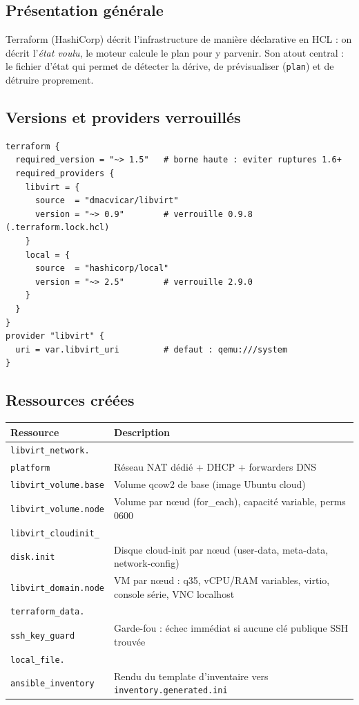 \documentclass[12pt,a4paper]{article}
\begin{document}
\subsection{Présentation générale}
Terraform (HashiCorp) décrit l'infrastructure de manière déclarative en HCL : on décrit l'\emph{état voulu}, le moteur calcule le plan pour y parvenir. Son atout central : le fichier d'état qui permet de détecter la dérive, de prévisualiser (\texttt{plan}) et de détruire proprement.

\subsection{Versions et providers verrouillés}
\begin{lstlisting}[caption={main.tf --- épinglage des versions (extrait)}]
terraform {
  required_version = "~> 1.5"   # borne haute : eviter ruptures 1.6+
  required_providers {
    libvirt = {
      source  = "dmacvicar/libvirt"
      version = "~> 0.9"        # verrouille 0.9.8 (.terraform.lock.hcl)
    }
    local = {
      source  = "hashicorp/local"
      version = "~> 2.5"        # verrouille 2.9.0
    }
  }
}
provider "libvirt" {
  uri = var.libvirt_uri         # defaut : qemu:///system
}
\end{lstlisting}

\subsection{Ressources créées}
\begin{longtable}{@{}p{4.4cm}p{9.8cm}@{}}
\toprule
\textbf{Ressource} & \textbf{Description} \\
\midrule
\endhead
\texttt{libvirt\_network.}\\ \texttt{platform} & Réseau NAT dédié + DHCP + forwarders DNS \\
\texttt{libvirt\_volume.base} & Volume qcow2 de base (image Ubuntu cloud) \\
\texttt{libvirt\_volume.node} & Volume par nœud (for\_each), capacité variable, perms 0600 \\
\texttt{libvirt\_cloudinit\_}\\ \texttt{disk.init} & Disque cloud-init par nœud (user-data, meta-data, network-config) \\
\texttt{libvirt\_domain.node} & VM par nœud : q35, vCPU/RAM variables, virtio, console série, VNC localhost \\
\texttt{terraform\_data.}\\ \texttt{ssh\_key\_guard} & Garde-fou : échec immédiat si aucune clé publique SSH trouvée \\
\texttt{local\_file.}\\ \texttt{ansible\_inventory} & Rendu du template d'inventaire vers \texttt{inventory.generated.ini} \\
\bottomrule
\end{longtable}
\end{document}

